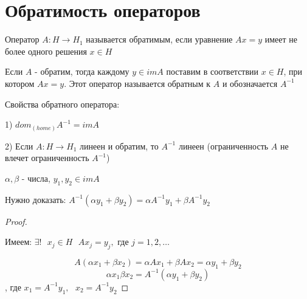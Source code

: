 \documentclass[12pt, a4paper]{report}
\begin{document}
\section{Обратимость операторов}

\begin{definition}
    Оператор \( A: H \to  H_1 \)  называется обратимым, если уравнение \( Ax =y \) имеет не более одного решения \( x \in  H \) 
\end{definition}

\begin{definition}
    Если \( A  \) - обратим, тогда каждому \( y \in im A  \)  поставим  в соответствии \( x \in  H \), при котором \( Ax =y \). Этот оператор называется обратным к \( A \) и обозначается \( A^{-1}  \) 
\end{definition}

Свойства обратного оператора: 

1) \( dom_{(home)} A ^{-1} = im A  \) 

2) Если \( A: H \to  H_1 \) линеен и обратим, то \( A^{-1}  \) линеен (ограниченность \( A \) не влечет ограниченность \( A^{-1}  \))

\( \alpha , \beta  \) - числа, \( y_1, y_2 \in  imA  \) 

Нужно доказать: \( A^{-1 }  (\alpha y_1 + \beta y_2 ) = \alpha A^{-1 }  y_1 + \beta A^{-1 } y_2 \) 

\begin{proof} \(  \) 

    Имеем: \( \exists  ! \text{ }  x_j \in  H \text{ } A x_j = y_j, \text{ где } j=1,2, \ldots \) 

\[ A (\alpha x_1  + \beta x_2 ) = \alpha A x_1 + \beta A x_2 = \alpha y_1 + \beta y_2  \] 
\[ \alpha x_1 \beta x_2 = A^{-1 }  (\alpha y_1 + \beta y_2 ) \] 
, где \( x_1 = A^{-1 }  y_1 , \text{ }  x_2 = A^{-1 }  y_2  \) 

\end{proof}


\ifdefined\mainfile
\else
    
\end{document}
